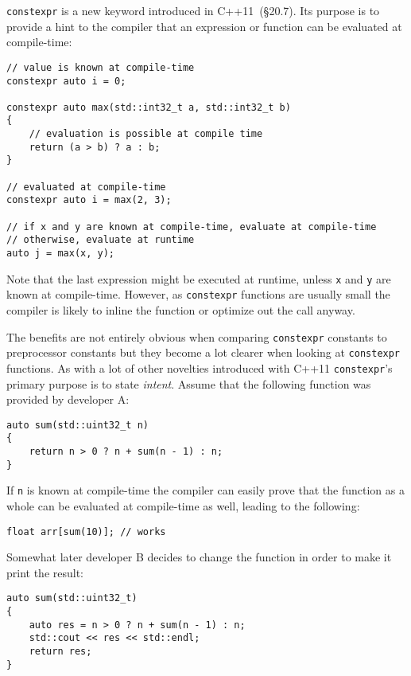 \texttt{constexpr} is a new keyword introduced in C++11~\cite{cpp11std}(§20.7). Its purpose is to provide a hint to the compiler that an expression or function can be evaluated at compile-time:

\begin{lstlisting}
// value is known at compile-time
constexpr auto i = 0;

constexpr auto max(std::int32_t a, std::int32_t b)
{
    // evaluation is possible at compile time
    return (a > b) ? a : b;
}

// evaluated at compile-time
constexpr auto i = max(2, 3);

// if x and y are known at compile-time, evaluate at compile-time
// otherwise, evaluate at runtime
auto j = max(x, y);
\end{lstlisting}

Note that the last expression might be executed at runtime, unless \texttt{x} and \texttt{y} are known at compile-time. However, as \texttt{constexpr} functions are usually small the compiler is likely to inline the function or optimize out the call anyway.

The benefits are not entirely obvious when comparing \texttt{constexpr} constants to preprocessor constants but they become a lot clearer when looking at \texttt{constexpr} functions. As with a lot of other novelties introduced with C++11 \texttt{constexpr}'s primary purpose is to state \textit{intent}. Assume that the following function was provided by developer A:

\begin{lstlisting}
auto sum(std::uint32_t n)
{
    return n > 0 ? n + sum(n - 1) : n;
}
\end{lstlisting}

If \texttt{n} is known at compile-time the compiler can easily prove that the function as a whole can be evaluated at compile-time as well, leading to the following:

\begin{lstlisting}
float arr[sum(10)]; // works
\end{lstlisting}

Somewhat later developer B decides to change the function in order to make it print the result:

\begin{lstlisting}
auto sum(std::uint32_t)
{
    auto res = n > 0 ? n + sum(n - 1) : n;
    std::cout << res << std::endl;
    return res;
}
\end{lstlisting}

